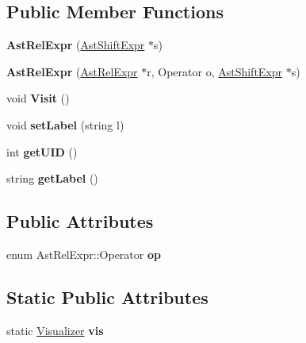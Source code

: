 \subsection*{Public Member Functions}
\begin{DoxyCompactItemize}
\item 
\hypertarget{classAstRelExpr_a17bddafe8d750f50ae41eb9c87410b1e}{{\bfseries Ast\-Rel\-Expr} (\hyperlink{classAstShiftExpr}{Ast\-Shift\-Expr} $\ast$s)}\label{classAstRelExpr_a17bddafe8d750f50ae41eb9c87410b1e}

\item 
\hypertarget{classAstRelExpr_a7a8c51e92d85456cd8da5b426f6958cf}{{\bfseries Ast\-Rel\-Expr} (\hyperlink{classAstRelExpr}{Ast\-Rel\-Expr} $\ast$r, Operator o, \hyperlink{classAstShiftExpr}{Ast\-Shift\-Expr} $\ast$s)}\label{classAstRelExpr_a7a8c51e92d85456cd8da5b426f6958cf}

\item 
\hypertarget{classAstRelExpr_ae1a3ad7c0ce7a205222ec0b1de5ee884}{void {\bfseries Visit} ()}\label{classAstRelExpr_ae1a3ad7c0ce7a205222ec0b1de5ee884}

\item 
\hypertarget{classAST_a71d680856e95ff89f55d5311a552eba6}{void {\bfseries set\-Label} (string l)}\label{classAST_a71d680856e95ff89f55d5311a552eba6}

\item 
\hypertarget{classAST_ab7a5b1d9f1c2de0d98deb356f724a42c}{int {\bfseries get\-U\-I\-D} ()}\label{classAST_ab7a5b1d9f1c2de0d98deb356f724a42c}

\item 
\hypertarget{classAST_aee029be902fffc927d16ccb03eb922ad}{string {\bfseries get\-Label} ()}\label{classAST_aee029be902fffc927d16ccb03eb922ad}

\end{DoxyCompactItemize}
\subsection*{Public Attributes}
\begin{DoxyCompactItemize}
\item 
\hypertarget{classAstRelExpr_abe0b0000f35f1e02a8999c61e6c8f48b}{enum Ast\-Rel\-Expr\-::\-Operator {\bfseries op}}\label{classAstRelExpr_abe0b0000f35f1e02a8999c61e6c8f48b}

\end{DoxyCompactItemize}
\subsection*{Static Public Attributes}
\begin{DoxyCompactItemize}
\item 
\hypertarget{classAST_aca9e6637209b31e03a09c0d42f29bdfa}{static \hyperlink{classVisualizer}{Visualizer} {\bfseries vis}}\label{classAST_aca9e6637209b31e03a09c0d42f29bdfa}

\end{DoxyCompactItemize}
